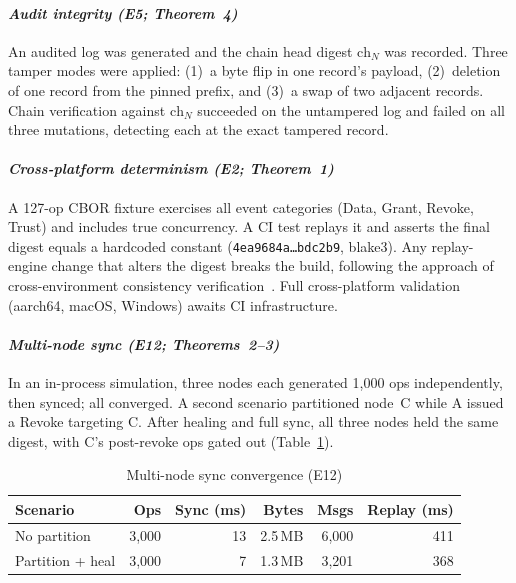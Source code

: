 \documentclass[10pt,journal,compsoc]{IEEEtran}
\begin{document}
\paragraph*{\textit{Audit integrity (E5; Theorem~4)}}
An audited log was generated and the chain head digest $\mathrm{ch}_N$ was recorded. Three tamper modes were applied: (1)~a byte flip in one record's payload, (2)~deletion of one record from the pinned prefix, and (3)~a swap of two adjacent records. Chain verification against $\mathrm{ch}_N$ succeeded on the untampered log and failed on all three mutations, detecting each at the exact tampered record.

\paragraph*{\textit{Cross-platform determinism (E2; Theorem~1)}}
A 127-op CBOR fixture exercises all event categories (Data, Grant, Revoke, Trust) and includes true concurrency. A CI test replays it and asserts the final digest equals a hardcoded constant (\texttt{\small 4ea9684a\ldots bdc2b9}, blake3). Any replay-engine change that alters the digest breaks the build, following the approach of cross-environment consistency verification~\cite{7163066}. Full cross-platform validation (aarch64, macOS, Windows) awaits CI infrastructure.

\paragraph*{\textit{Multi-node sync (E12; Theorems~2--3)}}
In an in-process simulation, three nodes each generated 1{,}000 ops independently, then synced; all converged. A second scenario partitioned node~C while A issued a Revoke targeting C. After healing and full sync, all three nodes held the same digest, with C's post-revoke ops gated out (Table~\ref{tab:e12-sync-paperC}).

\begin{table}[htbp]
\centering
\caption{Multi-node sync convergence (E12)}
\label{tab:e12-sync-paperC}
\begin{tabular}{@{}lrrrrr@{}}
\toprule
\textbf{Scenario} & \textbf{Ops} & \textbf{Sync (ms)} & \textbf{Bytes} & \textbf{Msgs} & \textbf{Replay (ms)} \\
\midrule
No partition     & 3,000 & 13  & 2.5\,MB & 6,000 & 411 \\
Partition + heal & 3,000 & 7   & 1.3\,MB & 3,201 & 368 \\
\bottomrule
\end{tabular}
\end{table}
\end{document}
